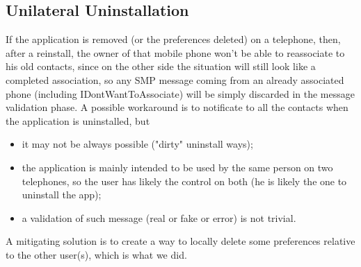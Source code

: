 \subsection{Unilateral Uninstallation}
If the application is removed (or the preferences deleted) on a telephone, then, after a reinstall, the owner of that mobile phone won't be able to reassociate to his old contacts, since on the other side the situation will still look like a completed association, so any SMP message coming from an already associated phone (including IDontWantToAssociate) will be simply discarded in the message validation phase. A possible workaround is to notificate to all the contacts when the application is uninstalled, but\\
\begin{itemize}
\item it may not be always possible ("dirty" uninstall ways);
\item the application is mainly intended to be used by the same person on two telephones, so the user has likely the control on both (he is likely the one to uninstall the app);
\item a validation of such message (real or fake or error) is not trivial.
\end{itemize}
\vspace{0.7cm}
A mitigating solution is to create a way to locally delete some preferences relative to the other user(s), which is what we did.